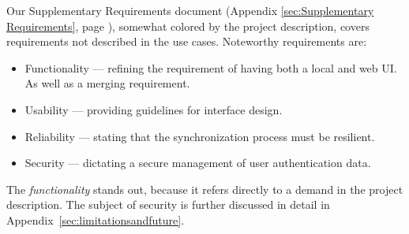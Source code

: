 Our Supplementary Requirements document (Appendix \ref{sec:Supplementary Requirements}, page \pageref{sec:Supplementary Requirements}), somewhat colored by the project description, covers requirements not described in the use cases. 
Noteworthy requirements are: 
\begin{itemize}
\item Functionality --- refining the requirement of having both a local and web UI. As well as a merging requirement.
\item Usability --- providing guidelines for interface design.
\item Reliability --- stating that the synchronization process must be resilient.
\item Security --- dictating a secure management of user authentication data.
\end{itemize}
The \emph{functionality} stands out, because it refers directly to a demand in the project description.
The subject of security is further discussed in detail in Appendix~\ref{sec:limitationsandfuture}.